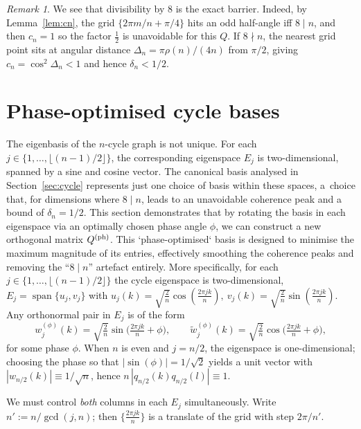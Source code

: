 \documentclass[12pt,fleqn]{amsart}
\theoremstyle{definition}
\theoremstyle{remark}
\newtheorem{rem}[thm]{Remark}
\newcommand{\1}{\mathbf{1}}
\begin{document}
\begin{rem}We see that divisibility by $8$ is the exact barrier. Indeed, by Lemma~\ref{lem:cn}, the grid $\{2\pi m/n+\pi/4\}$ hits an odd half-angle iff $8\mid n$, and then $c_n=1$ so the factor $\tfrac12$ is unavoidable for this $Q$. If $8\nmid n$, the nearest grid point sits at angular distance $\Delta_n=\pi\rho(n)/(4n)$ from $\pi/2$, giving $c_n=\cos^2\Delta_n<1$ and hence $\delta_n<1/2$.
\end{rem}

\section{Phase-optimised cycle bases}\label{sec:phase}

The eigenbasis of the $n$-cycle graph is not unique. For each $j \in \{1, \dots, \lfloor(n-1)/2\rfloor\}$, the corresponding eigenspace $E_j$ is two-dimensional, spanned by a sine and cosine vector. The canonical basis analysed in Section~\ref{sec:cycle} represents just one choice of basis within these spaces, a~choice that, for dimensions where $8 \mid n$, leads to an unavoidable coherence peak and a bound of $\delta_n=1/2$. This section demonstrates that by rotating the basis in each eigenspace via an optimally chosen phase angle $\phi$, we can construct a new orthogonal matrix $Q^{\rm (ph)}$. This `phase-optimised` basis is designed to minimise the maximum magnitude of its entries, effectively smoothing the coherence peaks and removing the ``$8 \mid n$'' artefact entirely. More specifically, for each $j\in\{1,\dots,\lfloor(n-1)/2\rfloor\}$ the cycle eigenspace is two-dimensional,
$E_j=\operatorname{span}\{u_j,v_j\}$ with
\(
u_j(k)=\sqrt{\tfrac2n}\cos(\tfrac{2\pi jk}{n}),
\ v_j(k)=\sqrt{\tfrac2n}\sin(\tfrac{2\pi jk}{n}) .
\)
Any orthonormal pair in $E_j$ is of the form
\[
w^{(\phi)}_j(k)=\sqrt{\tfrac{2}{n}}\sin\!\Big(\tfrac{2\pi jk}{n}+\phi\Big),\qquad
\tilde w^{(\phi)}_j(k)=\sqrt{\tfrac{2}{n}}\cos\!\Big(\tfrac{2\pi jk}{n}+\phi\Big),
\]
for some phase $\phi$. When $n$ is even and $j=n/2$, the eigenspace is one-dimensional; choosing the phase so that $|\sin(\phi)|=1/\sqrt2$ yields a unit vector with $|w_{n/2}(k)|\equiv 1/\sqrt n$, hence $n\,|q_{n/2}(k)q_{n/2}(l)|\equiv 1$.

We must control \emph{both} columns in each $E_j$ simultaneously. Write $n':=n/\gcd(j,n)$; then $\{\tfrac{2\pi jk}{n}\}$ is a translate of the grid with step $2\pi/n'$.
\end{document}
